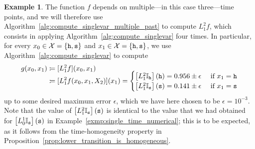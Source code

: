 \documentclass[10pt,a4paper]{paper}
\theoremstyle{definition}
\newtheorem{exmp}{Example}%
\newcommand{\states}{\mathcal{X}}
\newcommand{\ind}[1]{\mathbb{I}_{#1}}
\newcommand{\coloneqq}{:\!=}
\begin{document}
\begin{exmp}
The function $f$ depends on multiple---in this case three---time points, and we will therefore use Algorithm~\ref{alg:compute_singlevar_multiple_past} to compute $L_1^2f$, which consists in applying Algorithm~\ref{alg:compute_singlevar} four times. In particular, for every $x_0\in\states=\{{\tt h},{\tt s}\}$ and $x_1\in\states=\{{\tt h},{\tt s}\}$, we use Algorithm~\ref{alg:compute_singlevar} to compute
\begin{align*}
g(x_0,x_1)
&\coloneqq
[L_1^2f](x_0,x_1)\\[-7pt]
&\coloneqq
[L_1^2f(x_0,x_1,X_2)](x_1)
=
\begin{cases}
\left[L_1^2\ind{{\tt h}}\right](\text{{\tt h}})=0.956\pm\epsilon
&\text{ if $x_1={\tt h}$}\\
\left[L_1^2\ind{{\tt s}}\right](\text{{\tt s}})=0.141\pm\epsilon
&\text{ if $x_1={\tt s}$}
\end{cases}
\end{align*}
up to some desired maximum error $\epsilon$, which we have here chosen to be $\epsilon=10^{-3}$. Note that the value of $\left[L_1^2\ind{{\tt s}}\right](\text{{\tt s}})$ is identical to the value that we had obtained for $\left[L_0^1\ind{{\tt s}}\right](\text{{\tt s}})$ in Example~\ref{exmp:single_time_numerical}; this is to be expected, as it follows from the time-homogeneity property in Proposition~\ref{prop:lower_transition_is_homogeneous}.


\end{exmp}
\end{document}
